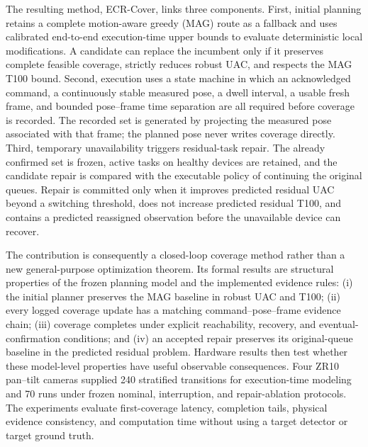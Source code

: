The resulting method, ECR-Cover, links three components. First, initial planning retains a complete motion-aware greedy (MAG) route as a fallback and uses calibrated end-to-end execution-time upper bounds to evaluate deterministic local modifications. A candidate can replace the incumbent only if it preserves complete feasible coverage, strictly reduces robust UAC, and respects the MAG T100 bound. Second, execution uses a state machine in which an acknowledged command, a continuously stable measured pose, a dwell interval, a usable fresh frame, and bounded pose--frame time separation are all required before coverage is recorded. The recorded set is generated by projecting the measured pose associated with that frame; the planned pose never writes coverage directly. Third, temporary unavailability triggers residual-task repair. The already confirmed set is frozen, active tasks on healthy devices are retained, and the candidate repair is compared with the executable policy of continuing the original queues. Repair is committed only when it improves predicted residual UAC beyond a switching threshold, does not increase predicted residual T100, and contains a predicted reassigned observation before the unavailable device can recover.

The contribution is consequently a closed-loop coverage method rather than a new general-purpose optimization theorem. Its formal results are structural properties of the frozen planning model and the implemented evidence rules: (i) the initial planner preserves the MAG baseline in robust UAC and T100; (ii) every logged coverage update has a matching command--pose--frame evidence chain; (iii) coverage completes under explicit reachability, recovery, and eventual-confirmation conditions; and (iv) an accepted repair preserves its original-queue baseline in the predicted residual problem. Hardware results then test whether these model-level properties have useful observable consequences. Four ZR10 pan--tilt cameras supplied 240 stratified transitions for execution-time modeling and 70 runs under frozen nominal, interruption, and repair-ablation protocols. The experiments evaluate first-coverage latency, completion tails, physical evidence consistency, and computation time without using a target detector or target ground truth.

